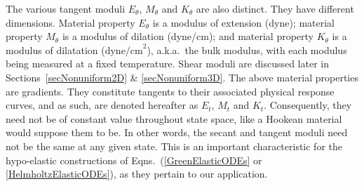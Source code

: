 The various tangent moduli $E_{\theta}$, $M_{\theta}$ and $K_{\theta}$ are also distinct.  They have different dimensions.  Material property $E_{\theta}$ is a modulus of extension (dyne); material property $M_{\theta}$ is a modulus of dilation (dyne/cm); and material property $K_{\theta}$ is a modulus of dilatation ($\text{dyne/cm}^2$), a.k.a.\ the bulk modulus, with each modulus being measured at a fixed temperature.  Shear moduli are discussed later in Sections~\ref{secNonuniform2D} \& \ref{secNonuniform3D}.  The above material properties are gradients.  They constitute tangents to their associated physical response curves, and as such, are denoted hereafter as $E_t$, $M_t$ and $K_t$.  Consequently, they need not be of constant value throughout state space, like a Hookean material would suppose them to be.  In other words, the secant and tangent moduli need not be the same at any given state.  This is an important characteristic for the hypo-elastic constructions of Eqns.~(\ref{GreenElasticODEs} or \ref{HelmholtzElasticODEs}), as they pertain to our application. 

